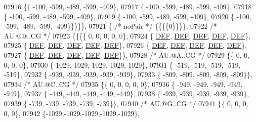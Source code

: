 \begin{DoxyCode}
07916 \{\{ -100, -599, -489, -599, -409\},
07917 \{ -100, -599, -489, -599, -409\},
07918 \{ -100, -599, -489, -599, -409\},
07919 \{ -100, -599, -489, -599, -409\},
07920 \{ -100, -599, -489, -599, -409\}\}\}\}\},
07921 \{ \textcolor{comment}{/* noPair */} \{\{\{\{0\}\}\}\},
07922 \textcolor{comment}{/* AU.@@..CG */}
07923 \{\{\{\{    0,    0,    0,    0,    0\},
07924 \{  \mbox{\hyperlink{1_88_84__epars_8h_a397419fc12b37ed479c8abb9d444d843}{DEF}},  \mbox{\hyperlink{1_88_84__epars_8h_a397419fc12b37ed479c8abb9d444d843}{DEF}},  \mbox{\hyperlink{1_88_84__epars_8h_a397419fc12b37ed479c8abb9d444d843}{DEF}},  \mbox{\hyperlink{1_88_84__epars_8h_a397419fc12b37ed479c8abb9d444d843}{DEF}},  \mbox{\hyperlink{1_88_84__epars_8h_a397419fc12b37ed479c8abb9d444d843}{DEF}}\},
07925 \{  \mbox{\hyperlink{1_88_84__epars_8h_a397419fc12b37ed479c8abb9d444d843}{DEF}},  \mbox{\hyperlink{1_88_84__epars_8h_a397419fc12b37ed479c8abb9d444d843}{DEF}},  \mbox{\hyperlink{1_88_84__epars_8h_a397419fc12b37ed479c8abb9d444d843}{DEF}},  \mbox{\hyperlink{1_88_84__epars_8h_a397419fc12b37ed479c8abb9d444d843}{DEF}},  \mbox{\hyperlink{1_88_84__epars_8h_a397419fc12b37ed479c8abb9d444d843}{DEF}}\},
07926 \{  \mbox{\hyperlink{1_88_84__epars_8h_a397419fc12b37ed479c8abb9d444d843}{DEF}},  \mbox{\hyperlink{1_88_84__epars_8h_a397419fc12b37ed479c8abb9d444d843}{DEF}},  \mbox{\hyperlink{1_88_84__epars_8h_a397419fc12b37ed479c8abb9d444d843}{DEF}},  \mbox{\hyperlink{1_88_84__epars_8h_a397419fc12b37ed479c8abb9d444d843}{DEF}},  \mbox{\hyperlink{1_88_84__epars_8h_a397419fc12b37ed479c8abb9d444d843}{DEF}}\},
07927 \{  \mbox{\hyperlink{1_88_84__epars_8h_a397419fc12b37ed479c8abb9d444d843}{DEF}},  \mbox{\hyperlink{1_88_84__epars_8h_a397419fc12b37ed479c8abb9d444d843}{DEF}},  \mbox{\hyperlink{1_88_84__epars_8h_a397419fc12b37ed479c8abb9d444d843}{DEF}},  \mbox{\hyperlink{1_88_84__epars_8h_a397419fc12b37ed479c8abb9d444d843}{DEF}},  \mbox{\hyperlink{1_88_84__epars_8h_a397419fc12b37ed479c8abb9d444d843}{DEF}}\}\},
07928 \textcolor{comment}{/* AU.@A..CG */}
07929 \{\{    0,    0,    0,    0,    0\},
07930 \{-1029,-1029,-1029,-1029,-1029\},
07931 \{ -519, -519, -519, -519, -519\},
07932 \{ -939, -939, -939, -939, -939\},
07933 \{ -809, -809, -809, -809, -809\}\},
07934 \textcolor{comment}{/* AU.@C..CG */}
07935 \{\{    0,    0,    0,    0,    0\},
07936 \{ -949, -949, -949, -949, -949\},
07937 \{ -449, -449, -449, -449, -449\},
07938 \{ -939, -939, -939, -939, -939\},
07939 \{ -739, -739, -739, -739, -739\}\},
07940 \textcolor{comment}{/* AU.@G..CG */}
07941 \{\{    0,    0,    0,    0,    0\},
07942 \{-1029,-1029,-1029,-1029,-1029\},

\end{DoxyCode}
